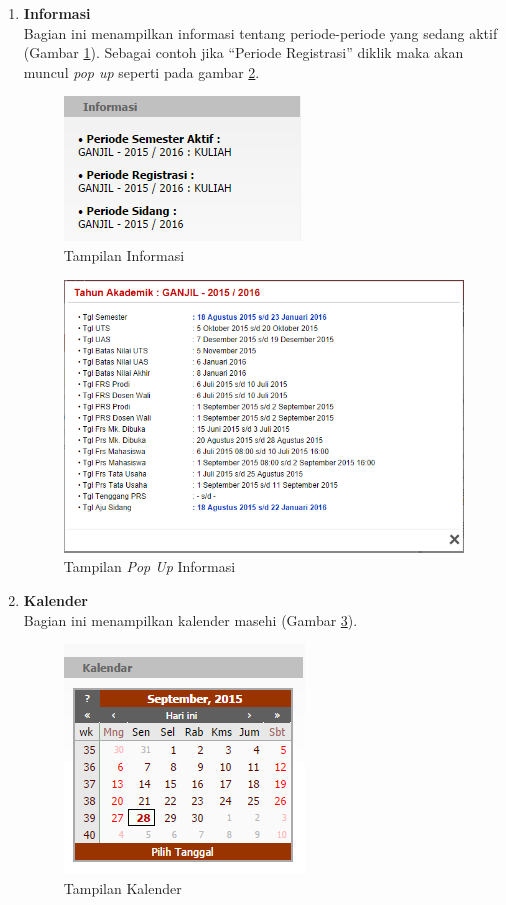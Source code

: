 \begin{enumerate}
	\item \textbf{Informasi}\\
		Bagian ini menampilkan informasi tentang periode-periode yang sedang aktif (Gambar \ref{fig:3_pam_utama_informasi}). Sebagai contoh jika ``Periode Registrasi'' diklik maka akan muncul \textit{pop up} seperti pada gambar \ref{fig:3_pam_utama_informasipop}.
			\begin{figure}[H]
				\centering
				\includegraphics[scale=0.75]{Gambar/pam-utama-informasi}
				\caption{Tampilan Informasi} 
				\label{fig:3_pam_utama_informasi}
			\end{figure}
			
			\begin{figure}[H]
				\centering
				\includegraphics[scale=0.5]{Gambar/pam-utama-infopop}
				\caption{Tampilan \textit{Pop Up} Informasi} 
				\label{fig:3_pam_utama_informasipop}
			\end{figure}
		
	\item \textbf{Kalender}\\
		Bagian ini menampilkan kalender masehi (Gambar \ref{fig:3_pam_utama_kalender}).
		\begin{figure}[H]
				\centering
				\includegraphics[scale=0.75]{Gambar/pam-utama-kalender}
				\caption{Tampilan Kalender} 
				\label{fig:3_pam_utama_kalender}
			\end{figure}
		

\end{enumerate}
